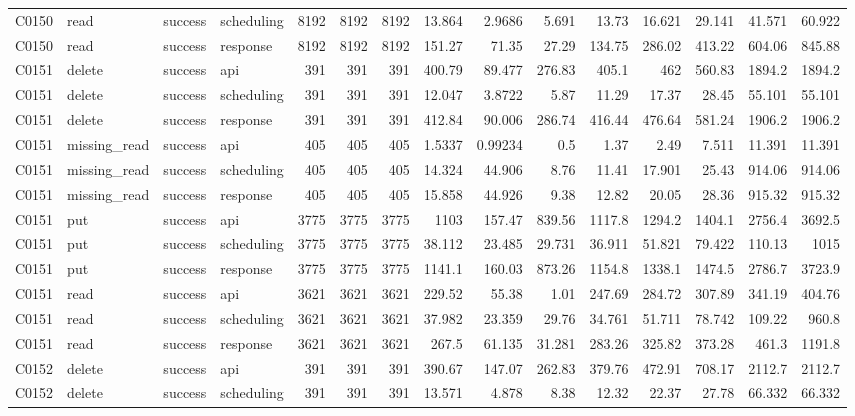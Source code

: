 \begin{landscape}
\begin{longtable}{llllrrrrrrrrrrr}
C0150 & read & success & scheduling & 8192 & 8192 & 8192 & 13.864 & 2.9686 & 5.691 & 13.73 & 16.621 & 29.141 & 41.571 & 60.922\\
C0150 & read & success & response & 8192 & 8192 & 8192 & 151.27 & 71.35 & 27.29 & 134.75 & 286.02 & 413.22 & 604.06 & 845.88\\
C0151 & delete & success & api & 391 & 391 & 391 & 400.79 & 89.477 & 276.83 & 405.1 & 462 & 560.83 & 1894.2 & 1894.2\\
C0151 & delete & success & scheduling & 391 & 391 & 391 & 12.047 & 3.8722 & 5.87 & 11.29 & 17.37 & 28.45 & 55.101 & 55.101\\
C0151 & delete & success & response & 391 & 391 & 391 & 412.84 & 90.006 & 286.74 & 416.44 & 476.64 & 581.24 & 1906.2 & 1906.2\\
C0151 & missing\_\allowbreak{}read & success & api & 405 & 405 & 405 & 1.5337 & 0.99234 & 0.5 & 1.37 & 2.49 & 7.511 & 11.391 & 11.391\\
C0151 & missing\_\allowbreak{}read & success & scheduling & 405 & 405 & 405 & 14.324 & 44.906 & 8.76 & 11.41 & 17.901 & 25.43 & 914.06 & 914.06\\
C0151 & missing\_\allowbreak{}read & success & response & 405 & 405 & 405 & 15.858 & 44.926 & 9.38 & 12.82 & 20.05 & 28.36 & 915.32 & 915.32\\
C0151 & put & success & api & 3775 & 3775 & 3775 & 1103 & 157.47 & 839.56 & 1117.8 & 1294.2 & 1404.1 & 2756.4 & 3692.5\\
C0151 & put & success & scheduling & 3775 & 3775 & 3775 & 38.112 & 23.485 & 29.731 & 36.911 & 51.821 & 79.422 & 110.13 & 1015\\
C0151 & put & success & response & 3775 & 3775 & 3775 & 1141.1 & 160.03 & 873.26 & 1154.8 & 1338.1 & 1474.5 & 2786.7 & 3723.9\\
C0151 & read & success & api & 3621 & 3621 & 3621 & 229.52 & 55.38 & 1.01 & 247.69 & 284.72 & 307.89 & 341.19 & 404.76\\
C0151 & read & success & scheduling & 3621 & 3621 & 3621 & 37.982 & 23.359 & 29.76 & 34.761 & 51.711 & 78.742 & 109.22 & 960.8\\
C0151 & read & success & response & 3621 & 3621 & 3621 & 267.5 & 61.135 & 31.281 & 283.26 & 325.82 & 373.28 & 461.3 & 1191.8\\
C0152 & delete & success & api & 391 & 391 & 391 & 390.67 & 147.07 & 262.83 & 379.76 & 472.91 & 708.17 & 2112.7 & 2112.7\\
C0152 & delete & success & scheduling & 391 & 391 & 391 & 13.571 & 4.878 & 8.38 & 12.32 & 22.37 & 27.78 & 66.332 & 66.332\\

\end{longtable}
\end{landscape}
